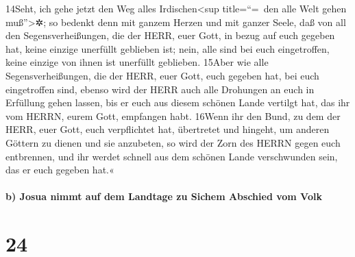 14Seht, ich gehe jetzt den Weg alles Irdischen\textless sup
title=``=~den alle Welt gehen muß''\textgreater✲; so bedenkt denn mit
ganzem Herzen und mit ganzer Seele, daß von all den Segensverheißungen,
die der HERR, euer Gott, in bezug auf euch gegeben hat, keine einzige
unerfüllt geblieben ist; nein, alle sind bei euch eingetroffen, keine
einzige von ihnen ist unerfüllt geblieben. 15Aber wie alle
Segensverheißungen, die der HERR, euer Gott, euch gegeben hat, bei euch
eingetroffen sind, ebenso wird der HERR auch alle Drohungen an euch in
Erfüllung gehen lassen, bis er euch aus diesem schönen Lande vertilgt
hat, das ihr vom HERRN, eurem Gott, empfangen habt. 16Wenn ihr den Bund,
zu dem der HERR, euer Gott, euch verpflichtet hat, übertretet und
hingeht, um anderen Göttern zu dienen und sie anzubeten, so wird der
Zorn des HERRN gegen euch entbrennen, und ihr werdet schnell aus dem
schönen Lande verschwunden sein, das er euch gegeben hat.«

\hypertarget{b-josua-nimmt-auf-dem-landtage-zu-sichem-abschied-vom-volk}{%
\paragraph{b) Josua nimmt auf dem Landtage zu Sichem Abschied vom
Volk}\label{b-josua-nimmt-auf-dem-landtage-zu-sichem-abschied-vom-volk}}

\hypertarget{section-23}{%
\section{24}\label{section-23}}

